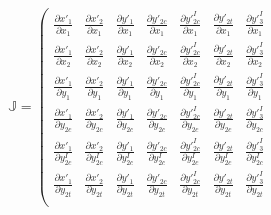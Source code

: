 \documentclass[11pt]{article}
\begin{document}
\begin{equation*}
	\mathbb{J} = \left( \begin{array}{ccccccc}

					\frac{\partial x'_1}{\partial x_1} &
					\frac{\partial x'_2}{\partial x_1} &
					\frac{\partial y'_1}{\partial x_{1}} &
					\frac{\partial y'_{2c}}{\partial x_1} &
					\frac{\partial y'^I_{2c}}{\partial x_1} &
					\frac{\partial y'_{2t}}{\partial x_1} &
					\frac{\partial y'^I_{3}}{\partial x_1} \\[1ex]

					\frac{\partial x'_1}{\partial x_2} &
					\frac{\partial x'_2}{\partial x_2} &
					\frac{\partial y'_1}{\partial x_{2}} &
					\frac{\partial y'_{2c}}{\partial x_2} &
					\frac{\partial y'^I_{2c}}{\partial x_2} &
					\frac{\partial y'_{2t}}{\partial x_2} &
					\frac{\partial y'^I_{3}}{\partial x_2} \\[1ex]

					\frac{\partial x'_1}{\partial y_1} &
					\frac{\partial x'_2}{\partial y_1} &
					\frac{\partial y'_1}{\partial y_{1}} &
					\frac{\partial y'_{2c}}{\partial y_1} &
					\frac{\partial y'^I_{2c}}{\partial y_1} &
					\frac{\partial y'_{2t}}{\partial y_1} &
					\frac{\partial y'^I_{3}}{\partial y_1} \\[1ex]

					\frac{\partial x'_1}{\partial y_{2c}} &
					\frac{\partial x'_2}{\partial y_{2c}} &
					\frac{\partial y'_1}{\partial y_{2c}} &
					\frac{\partial y'_{2c}}{\partial y_{2c}} &
					\frac{\partial y'^I_{2c}}{\partial y_{2c}} &
					\frac{\partial y'_{2t}}{\partial y_{2c}} &
					\frac{\partial y'^I_{3}}{\partial y_{2c}} \\[1ex]

					\frac{\partial x'_1}{\partial y^I_{2c}} &
					\frac{\partial x'_2}{\partial y^I_{2c}} &
					\frac{\partial y'_1}{\partial y^I_{2c}} &
					\frac{\partial y'_{2c}}{\partial y^I_{2c}} &
					\frac{\partial y'^I_{2c}}{\partial y^I_{2c}} &
					\frac{\partial y'_{2t}}{\partial y^I_{2c}} &
					\frac{\partial y'^I_{3}}{\partial y^I_{2c}} \\[1ex]

					\frac{\partial x'_1}{\partial y_{2t}} &
					\frac{\partial x'_2}{\partial y_{2t}} &
					\frac{\partial y'_1}{\partial y_{2t}} &
					\frac{\partial y'_{2c}}{\partial y_{2t}} &
					\frac{\partial y'^I_{2c}}{\partial y_{2t}} &
					\frac{\partial y'_{2t}}{\partial y_{2t}} &
					\frac{\partial y'^I_{3}}{\partial y_{2t}} \\[1ex]


\end{array}
\end{equation*}
\end{document}
